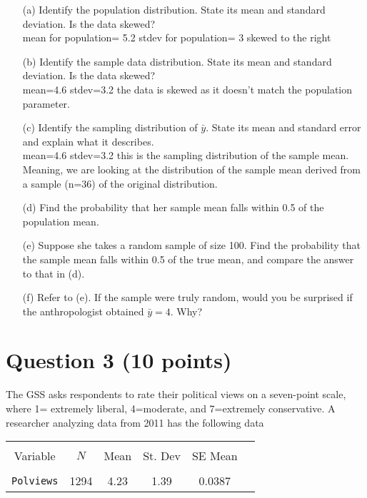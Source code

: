 \documentclass[12pt,letterpaper]{article}
\begin{document}
\begin{itemize}

\item[(a)] Identify the population distribution. State its mean and standard deviation. Is the data skewed?\\
mean for population= 5.2
stdev for population= 3
skewed to the right 

\item[(b)] Identify the sample data distribution. State its mean and standard deviation. Is the data skewed?\\

mean=4.6
stdev=3.2
the data is skewed as it doesn't match the population parameter.
\item[(c)] Identify the sampling distribution of $\bar{y}$. State its mean and standard error and explain what it describes.\\
mean=4.6 stdev=3.2
this is the sampling distribution of the sample mean. Meaning, we are looking at the distribution of the sample mean derived from a sample (n=36) of the original distribution.

\item[(d)] Find the probability that her sample mean falls within 0.5 of the population mean.\\


\item[(e)] Suppose she takes a random sample of size 100. Find the probability that the sample mean falls within 0.5 of the true mean, and compare the answer to that in (d).\\

\item[(f)] Refer to (e). If the sample were truly random, would you be surprised if the anthropologist obtained $\bar{y}=4$. Why?\\

\end{itemize}

\section*{Question 3 (10 points)}
The GSS asks respondents to rate their political views on a seven-point scale, where 1= extremely liberal, 4=moderate, and 7=extremely conservative. A researcher analyzing data from 2011 has the following data

\begin{table}[H]
\centering
\begin{tabular}{cccccc}
\hline \\[-1.8ex]
Variable & $N$ & Mean  & St. Dev & SE Mean \\ 
\hline \\[-1.8ex]
\texttt{Polviews} & 1294 & 4.23  & 1.39 & 0.0387 \\ 
\hline
\end{tabular} 
\end{table}
\end{document}
